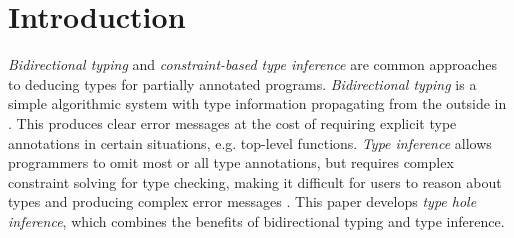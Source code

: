 



\section{Introduction}
\label{sec:intro}
\emph{Bidirectional typing} and \emph{constraint-based type inference} are common approaches to deducing types for partially annotated programs. \emph{Bidirectional typing} is a simple algorithmic system with type information propagating from the outside in  \cite{BidirTyping}. This produces clear error messages at the cost of requiring explicit type annotations in certain situations, e.g. top-level functions. \emph{Type inference} allows programmers to omit most or all type annotations, but requires complex constraint solving for type checking, making it difficult for users to reason about types and producing complex error messages \cite{typeinferDif}.
This paper develops \emph{type hole inference}, which combines the benefits of bidirectional typing and type inference.\par

